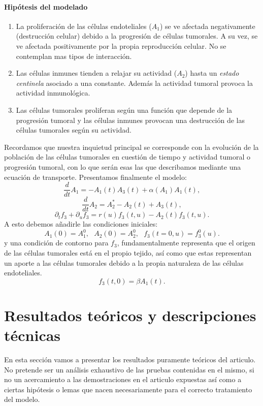 \documentclass[1p]{elsarticle}
\begin{document}
\paragraph{Hipótesis del modelado}
\begin{enumerate}
	\item La proliferación de las células endoteliales ($A_1$) se ve afectada negativamente (destrucción celular) debido a la progresión de células tumorales. A su vez, se ve afectada positivamente por la propia reproducción celular. No se contemplan mas tipos de interacción.
	\item Las células inmunes tienden a relajar su actividad ($A_2$) hasta un \textit{estado centinela} asociado a una constante. Además la actividad tumoral provoca la actividad inmunológica.
	\item Las células tumorales proliferan según una función que depende de la progresión tumoral y las células inmunes provocan una destrucción de las células tumorales según su actividad.
\end{enumerate}
Recordamos que nuestra inquietud principal se corresponde con la evolución de la población de las células tumorales en cuestión de tiempo y actividad tumoral o progresión tumoral, con lo que serán esas las que describamos mediante una ecuación de transporte. Presentamos finalmente el modelo:
\begin{equation}
\frac{d}{dt}A_1=-A_1(t)A_3(t)+\alpha(A_1)A_1(t),
\label{a1}
\end{equation}
\begin{equation}
\frac{d}{dt}A_2=A_2^*-A_2(t)+A_3(t),
\label{a2}
\end{equation}
\begin{equation}
\partial_tf_3+\partial_uf_3=r(u)f_3(t,u)-A_2(t)f_3(t,u).
\label{a3}
\end{equation}
A esto debemos añadirle las condiciones iniciales:
\begin{equation}
A_1(0)=A_1^0,\textrm{ }A_2(0)=A_2^0,\textrm{ }f_3(t=0,u)=f_3^0(u).
\label{condiciones}
\end{equation}
y una condición de contorno para $f_3$, fundamentalmente representa que el origen de las células tumorales está en el propio tejido, así como que estas representan un aporte a  las células tumorales debido a la propia naturaleza de las células endoteliales.
 \begin{equation}
 f_3(t,0)=\beta A_1(t).
 \label{condicionesf}
 \end{equation}
\section{Resultados teóricos y descripciones técnicas}
En esta sección vamos a presentar los resultados puramente teóricos del articulo. No pretende ser un análisis exhaustivo de las pruebas contenidas en el mismo, si no un acercamiento a las demostraciones en el articulo expuestas así como a ciertas hipótesis o lemas que nacen necesariamente para el correcto tratamiento del modelo.
\end{document}
